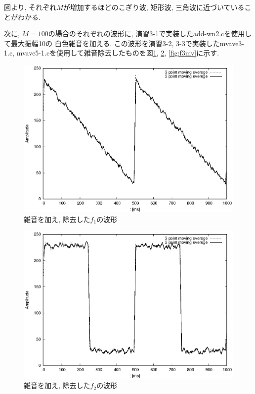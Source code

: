 \documentclass[titlepage]{jsarticle}
\begin{document}
    図より, それぞれ$M$が増加するほどのこぎり波, 矩形波, 三角波に近づいていることがわかる.

    次に, $M = 100$の場合のそれぞれの波形に, 演習3-1で実装したadd-wn2.cを使用して最大振幅10の
    白色雑音を加える. この波形を演習3-2, 3-3で実装したmvave3-1.c,
    mvave5-1.cを使用して雑音除去したものを図\ref{fig:f1mv}, \ref{fig:f2mv}, \ref{fig:f3mv}に示す.

    \begin{figure}[h]
        \centering
        \includegraphics[width=0.8\hsize]{images/f1mv.eps}
        \caption{雑音を加え, 除去した$f_1$の波形}
        \label{fig:f1mv}
    \end{figure}

    \begin{figure}[h]
        \centering
        \includegraphics[width=0.8\hsize]{images/f2mv.eps}
        \caption{雑音を加え, 除去した$f_2$の波形}
        \label{fig:f2mv}
    \end{figure}
\end{document}
